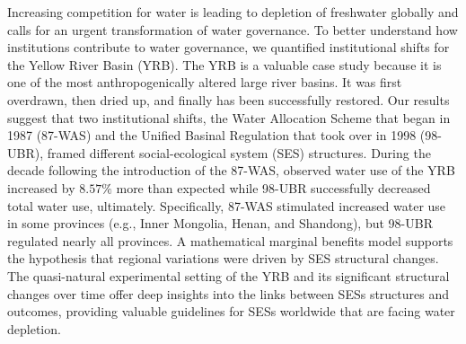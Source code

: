 Increasing competition for water is leading to depletion of freshwater globally and calls for an urgent transformation of water governance. To better understand how institutions contribute to water governance, we quantified institutional shifts for the Yellow River Basin (YRB).  The YRB is a valuable case study because it is one of the most anthropogenically altered large river basins. It was first overdrawn, then dried up, and finally has been successfully restored. Our results suggest that two institutional shifts, the Water Allocation Scheme that began in 1987 (87-WAS) and the Unified Basinal Regulation that took over in 1998 (98-UBR), framed different social-ecological system (SES) structures. During the decade following the introduction of the 87-WAS, observed water use of the YRB increased by $8.57\%$ more than expected while 98-UBR successfully decreased total water use, ultimately. Specifically, 87-WAS stimulated increased water use in some provinces (e.g., Inner Mongolia, Henan, and Shandong), but 98-UBR regulated nearly all provinces. A mathematical marginal benefits model supports the hypothesis that regional variations were driven by SES structural changes. The quasi-natural experimental setting of the YRB and its significant structural changes over time offer deep insights into the links between SESs structures and outcomes, providing valuable guidelines for SESs worldwide that are facing water depletion.
